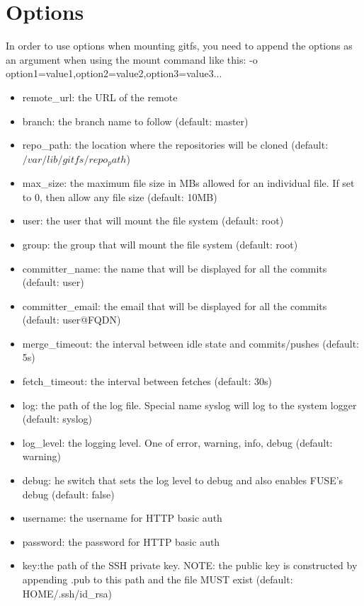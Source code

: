 \section{Options}
In order to use options when mounting gitfs, you need to append the options as an argument when using the mount command like this: -o option1=value1,option2=value2,option3=value3...

\begin{itemize}
    \item remote\_url: the URL of the remote
    \item branch: the branch name to follow (default: master)
    \item repo\_path: the location where the repositories will be cloned
    (default: $/var/lib/gitfs/repo_path$)
    \item max\_size: the maximum file size in MBs allowed for an individual file. If set to 0, then allow any file size (default: 10MB)
    \item user: the user that will mount the file system (default: root)
    \item group: the group that will mount the file system (default: root)
    \item committer\_name: the name that will be displayed for all the commits (default: user)
    \item committer\_email: the email that will be displayed for all the commits (default: user@FQDN)
    \item merge\_timeout:	the interval between idle state and commits/pushes (default: 5s)
    \item fetch\_timeout: 	the interval between fetches (default: 30s)
    \item log: the path of the log file. Special name syslog will log to the system logger (default: syslog)
    \item log\_level: the logging level. One of error, warning, info, debug (default: warning)
    \item debug: he switch that sets the log level to debug and also enables FUSE’s debug (default: false)
    \item username: the username for HTTP basic auth 
    \item password: the password for HTTP basic auth
    \item key:the path of the SSH private key. NOTE: the public key is constructed by appending .pub to this path and the file MUST exist (default: \textdollar HOME/.ssh/id\_rsa)
\end{itemize}